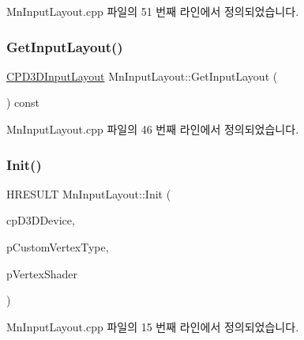 Mn\+Input\+Layout.\+cpp 파일의 51 번째 라인에서 정의되었습니다.

\mbox{\label{class_m_n_l_1_1_mn_input_layout_a5ee478e8c8e8da03ad71b44ac62f74c9}} 
\subsubsection{\texorpdfstring{Get\+Input\+Layout()}{GetInputLayout()}}
{\footnotesize\ttfamily \hyperlink{namespace_m_n_l_aec7a2a132d6e72492d5feb5926d838dd}{C\+P\+D3\+D\+Input\+Layout} Mn\+Input\+Layout\+::\+Get\+Input\+Layout (\begin{DoxyParamCaption}{ }\end{DoxyParamCaption}) const}



Mn\+Input\+Layout.\+cpp 파일의 46 번째 라인에서 정의되었습니다.

\mbox{\label{class_m_n_l_1_1_mn_input_layout_a7f97321379e253c8ae1c43c15a02f356}} 
\subsubsection{\texorpdfstring{Init()}{Init()}}
{\footnotesize\ttfamily H\+R\+E\+S\+U\+LT Mn\+Input\+Layout\+::\+Init (\begin{DoxyParamCaption}\item[{\hyperlink{namespace_m_n_l_a1eec210db8f309a4a9ac0d9658784c31}{C\+P\+D3\+D\+Device}}]{cp\+D3\+D\+Device,  }\item[{const std\+::shared\+\_\+ptr$<$ \hyperlink{class_m_n_l_1_1_mn_custom_vertex_type}{Mn\+Custom\+Vertex\+Type} $>$}]{p\+Custom\+Vertex\+Type,  }\item[{const std\+::shared\+\_\+ptr$<$ \hyperlink{class_m_n_l_1_1_mn_vertex_shader}{Mn\+Vertex\+Shader} $>$}]{p\+Vertex\+Shader }\end{DoxyParamCaption})}



Mn\+Input\+Layout.\+cpp 파일의 15 번째 라인에서 정의되었습니다.



